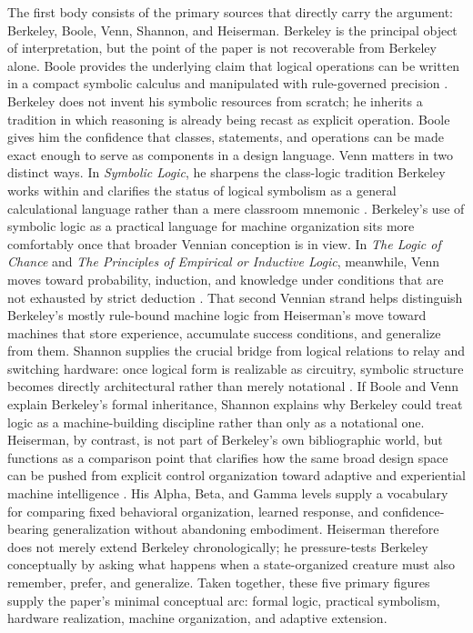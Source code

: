 \documentclass[11pt]{article}
\begin{document}
The first body consists of the primary sources that directly carry the argument: Berkeley, Boole, Venn, Shannon, and Heiserman. Berkeley is the principal object of interpretation, but the point of the paper is not recoverable from Berkeley alone. Boole provides the underlying claim that logical operations can be written in a compact symbolic calculus and manipulated with rule-governed precision \citep{boole1847mathematical,boole1854laws}. Berkeley does not invent his symbolic resources from scratch; he inherits a tradition in which reasoning is already being recast as explicit operation. Boole gives him the confidence that classes, statements, and operations can be made exact enough to serve as components in a design language. Venn matters in two distinct ways. In \emph{Symbolic Logic}, he sharpens the class-logic tradition Berkeley works within and clarifies the status of logical symbolism as a general calculational language rather than a mere classroom mnemonic \citep{venn1894symbolic}. Berkeley's use of symbolic logic as a practical language for machine organization sits more comfortably once that broader Vennian conception is in view. In \emph{The Logic of Chance} and \emph{The Principles of Empirical or Inductive Logic}, meanwhile, Venn moves toward probability, induction, and knowledge under conditions that are not exhausted by strict deduction \citep{venn1866chance,venn1889empirical}. That second Vennian strand helps distinguish Berkeley's mostly rule-bound machine logic from Heiserman's move toward machines that store experience, accumulate success conditions, and generalize from them. Shannon supplies the crucial bridge from logical relations to relay and switching hardware: once logical form is realizable as circuitry, symbolic structure becomes directly architectural rather than merely notational \citep{shannon1938symbolic}. If Boole and Venn explain Berkeley's formal inheritance, Shannon explains why Berkeley could treat logic as a machine-building discipline rather than only as a notational one. Heiserman, by contrast, is not part of Berkeley's own bibliographic world, but functions as a comparison point that clarifies how the same broad design space can be pushed from explicit control organization toward adaptive and experiential machine intelligence \citep{heiserman1981robot}. His Alpha, Beta, and Gamma levels supply a vocabulary for comparing fixed behavioral organization, learned response, and confidence-bearing generalization without abandoning embodiment. Heiserman therefore does not merely extend Berkeley chronologically; he pressure-tests Berkeley conceptually by asking what happens when a state-organized creature must also remember, prefer, and generalize. Taken together, these five primary figures supply the paper's minimal conceptual arc: formal logic, practical symbolism, hardware realization, machine organization, and adaptive extension.
\end{document}

